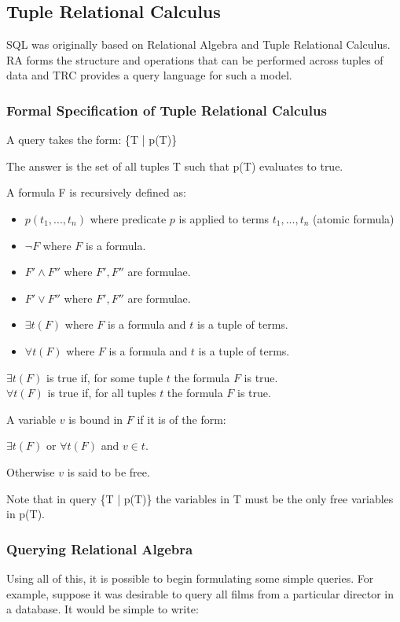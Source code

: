 \documentclass[a4paper, 11pt]{article}
\begin{document}
  \subsection{Tuple Relational Calculus}
    SQL was originally based on Relational Algebra and Tuple Relational
    Calculus. RA forms the structure and operations that can be performed
    across tuples of data and TRC provides a query language for such a model.

    \subsubsection{Formal Specification of Tuple Relational Calculus\cite{lecRA}}
      \label{sec:formalTRC}
      A query takes the form: \{T | p(T)\}

      The answer is the set of all tuples T such that p(T) evaluates to true.

      A formula F is recursively defined as:
      \begin{itemize}
        \item $p(t_1, ..., t_n)$ where predicate $p$ is applied to terms $t_1, ..., t_n$ (atomic formula)
        \item $\lnot F$ where $F$ is a formula.
        \item $F' \land F''$ where $F', F''$ are formulae.
        \item $F' \lor F''$ where $F', F''$ are formulae.
        \item $\exists t(F)$ where $F$ is a formula and $t$ is a tuple of terms.
        \item $\forall t(F)$ where $F$ is a formula and $t$ is a tuple of terms.
      \end{itemize}

      $\exists t(F)$ is true if, for some tuple $t$ the formula $F$ is true. \\
      $\forall t(F)$ is true if, for all tuples $t$ the formula $F$ is true.

      A variable $v$ is bound in $F$ if it is of the form:

      $\exists t(F)$ or $\forall t(F)$ and $v \in t$.

      Otherwise $v$ is said to be free.
      
      Note that in query \{T | p(T)\} the variables in T must be the only free variables in p(T).

    \subsubsection{Querying Relational Algebra}
      Using all of this, it is possible to begin formulating some simple
      queries. For example, suppose it was desirable to query all films from a
      particular director in a database. It would be simple to write:
\end{document}
